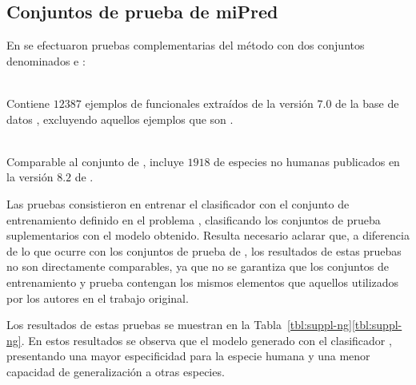 %
%
\subsection{Conjuntos de prueba de miPred}
%
En \cite{ng} se efectuaron pruebas complementarias del método
\work\mipred{} con dos conjuntos denominados  e
:
%
\begin{description}
\item{}\\
  Contiene $12387$ ejemplos de  funcionales extraídos de la
  versión $7$.$0$ de la base de datos  \cite{rfam},
  excluyendo aquellos ejemplos que son .
\item{}\\
  Comparable al conjunto  de \cite{xue}, incluye
  $1918$  de especies no humanas publicados en la versión
  $8$.$2$ de \work{\mirbase}.
\end{description}
%
Las pruebas consistieron en entrenar el clasificador con el conjunto
de entrenamiento definido en el problema \prob\mipred{}, clasificando
los conjuntos de prueba suplementarios con el modelo obtenido.
Resulta necesario aclarar que, a diferencia de lo que ocurre con los
conjuntos de prueba de \work\tripletsvm{}, los resultados de estas
pruebas no son directamente comparables, ya que no se garantiza que
los conjuntos de entrenamiento y prueba contengan los mismos elementos
que aquellos utilizados por los autores en el trabajo original.

Los resultados de estas pruebas se muestran en la
\iflatexml{}Tabla~\ref{tbl:suppl-ng}\else\autoref{tbl:suppl-ng}\fi.
En estos resultados se observa que el modelo generado con el
clasificador , presentando una mayor especificidad para la
especie humana y una menor capacidad de generalización a otras
especies.
